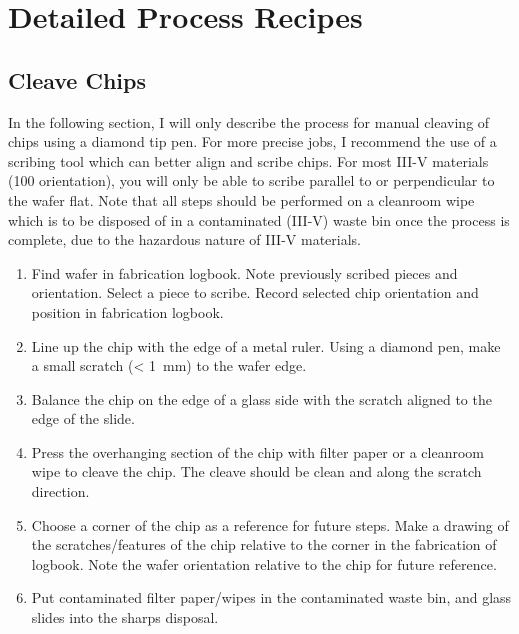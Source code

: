\section{Detailed Process Recipes}
\subsection{Cleave Chips}
\label{sec:cleave}
In the following section, I will only describe the process for manual cleaving of chips using a diamond tip pen.
For more precise jobs, I recommend the use of a scribing tool which can better align and scribe chips.
For most III-V materials (100 orientation), you will only be able to scribe parallel to or perpendicular to the wafer flat.
Note that all steps should be performed on a cleanroom wipe which is to be disposed of in a contaminated (III-V) waste bin
once the process is complete, due to the hazardous nature of III-V materials.
\begin{enumerate}
    \item Find wafer in fabrication logbook. Note previously scribed pieces and orientation. Select a piece to scribe. Record selected chip orientation and position in fabrication logbook.
    \item Line up the chip with the edge of a metal ruler. Using a diamond pen, make a small scratch (< \SI{1}{\milli\meter}) to the wafer edge.
    \item Balance the chip on the edge of a glass side with the scratch aligned to the edge of the slide.
    \item Press the overhanging section of the chip with filter paper or a cleanroom wipe to cleave the chip. The cleave should be clean and along the scratch direction.
    \item Choose a corner of the chip as a reference for future steps. Make a drawing of the scratches/features of the chip relative to the corner in the fabrication of logbook. Note the wafer orientation relative to the chip for future reference.
    \item Put contaminated filter paper/wipes in the contaminated waste bin, and glass slides into the sharps disposal.
\end{enumerate}

